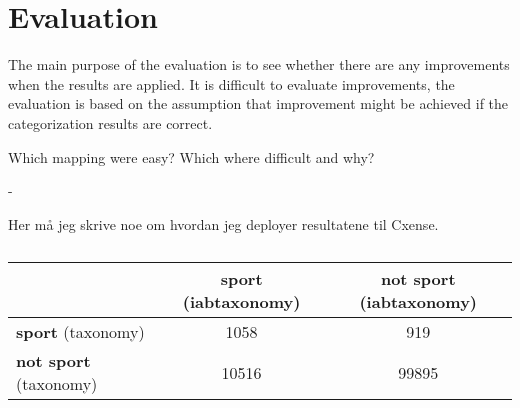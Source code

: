 \section{Evaluation}
The main purpose of the evaluation is to see whether there are any improvements when the results are applied. It is difficult to evaluate improvements, the evaluation is based on the assumption that improvement might be achieved if the categorization results are correct. 



Which mapping were easy? Which where difficult and why?

- 

\begin{code}

Her må jeg skrive noe om hvordan jeg deployer resultatene til Cxense. 

\end{code}

\begin{table}[ht]
\centering
\renewcommand{\arraystretch}{1.25}
\begin{tabularx}{\textwidth}{l |c|c}
 & \textbf{sport} (iabtaxonomy) & \textbf{not sport} (iabtaxonomy)\\ \hline
 \textbf{sport} (taxonomy) & 1058 & 919 \\ \hline
 \textbf{not sport} (taxonomy) & 10516 & 99895
\end{tabularx}
\\[10pt]
\caption{}
\label{tab:}
\end{table}


\begin{comment}
Date: 15/04/15

Med: igg-iabtaxonomy-sports
     taxonomy-sports
{
  "start": 1428671088, 
  "stop": 1429103088, 
  "data": {
    "events": 185237, 
    "urls": 1058
  }
}


Med: taxonomy-sports
Uten: igg-iabtaxonomy-sports
{
  "start": 1428673680, 
  "stop": 1429105680, 
  "data": {
    "events": 105114, 
    "urls": 919
  }
}

Med: igg-iabtaxonomy-sports
Uten: taxonomy-sports
{
  "start": 1428673711, 
  "stop": 1429105711, 
  "data": {
    "events": 1875914, 
    "urls": 10516
  }
}

Uten: igg-iabtaxonomy-sports
      taxonomy-sports
{
  "start": 1428673813, 
  "stop": 1429105813, 
  "data": {
    "events": 876519, 
    "urls": 9995
  }
}

\end{comment}




